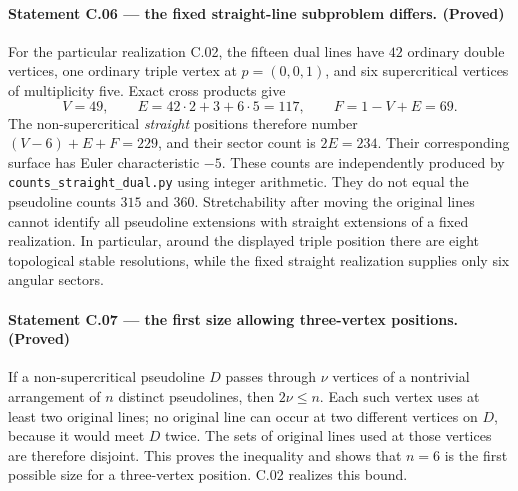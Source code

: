 \documentclass[11pt,a4paper]{article}
\begin{document}
\paragraph{Statement C.06 --- the fixed straight-line subproblem differs. (Proved)}\label{C.06}
For the particular realization C.02, the fifteen dual lines have
$42$ ordinary double vertices, one ordinary triple vertex at
$p=(0,0,1)$, and six supercritical vertices of multiplicity five.
Exact cross products give
\[
 V=49,\qquad E=42\cdot2+3+6\cdot5=117,\qquad
 F=1-V+E=69.
\]
The non-supercritical \emph{straight} positions therefore number
$(V-6)+E+F=229$, and their sector count is $2E=234$.
Their corresponding surface has Euler characteristic $-5$.
These counts are independently produced by
\texttt{counts\_straight\_dual.py} using integer arithmetic.
They do not equal the pseudoline counts $315$ and $360$.
Stretchability after moving the original lines cannot identify
all pseudoline extensions with straight extensions of a fixed
realization. In particular, around the displayed triple position
there are eight topological stable resolutions, while the fixed
straight realization supplies only six angular sectors.

\paragraph{Statement C.07 --- the first size allowing three-vertex positions. (Proved)}\label{C.07}
If a non-supercritical pseudoline $D$ passes through $\nu$ vertices
of a nontrivial arrangement of $n$ distinct pseudolines, then
$2\nu\le n$. Each such vertex uses at least two original lines;
no original line can occur at two different vertices on $D$,
because it would meet $D$ twice. The sets of original lines used
at those vertices are therefore disjoint. This proves the
inequality and shows that $n=6$ is the first possible size for
a three-vertex position. C.02 realizes this bound.
\end{document}
